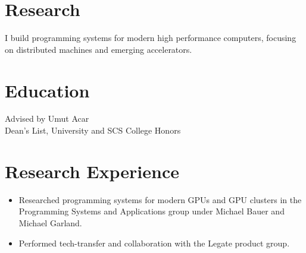 \documentclass[10pt,a4paper,sans]{moderncv}        %
\begin{document}
\makecvtitle

\section{Research}

I build programming systems for modern high performance computers, focusing
on distributed machines and emerging accelerators.

\section{Education}
{
Advised by Umut Acar\\
Dean's List, University and SCS College Honors
}

\section{Research Experience}


 {
\begin{itemize}
    \item Researched programming systems for modern GPUs and GPU clusters
        in the Programming Systems and Applications group under Michael Bauer and Michael Garland.
    \item Performed tech-transfer and collaboration with the Legate product group.
\end{itemize}
}
\end{document}
